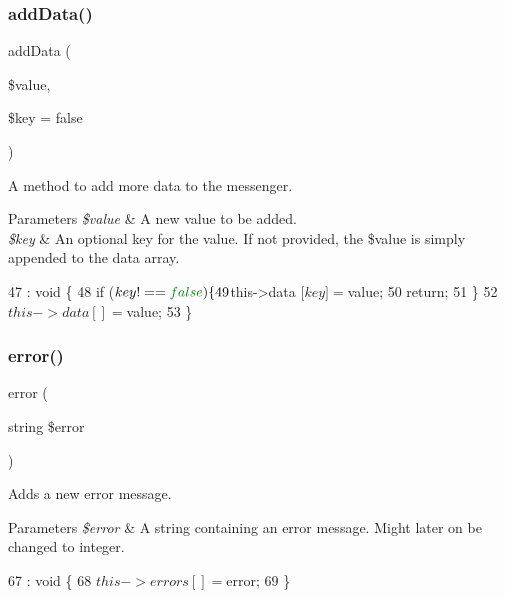 \subsubsection{add\+Data()}
{\footnotesize\ttfamily add\+Data (\begin{DoxyParamCaption}\item[{}]{\$value,  }\item[{}]{\$key = {\ttfamily false} }\end{DoxyParamCaption})}

A method to add more data to the messenger. 
\begin{DoxyParams}{Parameters}
{\em \$value} & A new value to be added. \\
\hline
{\em \$key} & An optional key for the value. If not provided, the \$value is simply appended to the data array. \\
\hline
\end{DoxyParams}

\begin{DoxyCode}
47                                                    : \textcolor{keywordtype}{void} \{
48         \textcolor{keywordflow}{if} ($key !== \textcolor{keyword}{false}) \{
49             $this->data [$key] = $value;
50             \textcolor{keywordflow}{return};
51         \}
52         $this->data [] = $value;
53     \}
\end{DoxyCode}
\mbox{\label{class_lora_1_1_messenger_a9f1c67f1ddff94d1fc4f665243996ce5}} 
\subsubsection{error()}
{\footnotesize\ttfamily error (\begin{DoxyParamCaption}\item[{string}]{\$error }\end{DoxyParamCaption})}

Adds a new error message. 
\begin{DoxyParams}{Parameters}
{\em \$error} & A string containing an error message. Might later on be changed to integer. \\
\hline
\end{DoxyParams}

\begin{DoxyCode}
67                                           : \textcolor{keywordtype}{void} \{
68         $this->errors [] = $error;
69     \}
\end{DoxyCode}
\mbox{\label{class_lora_1_1_messenger_a81a67162a6288d78fc4c55283325f0b4}} 
